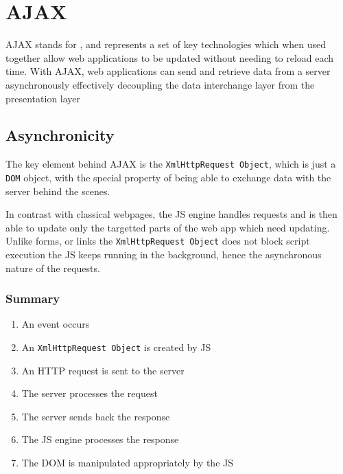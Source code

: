 \section{AJAX}

\par{AJAX stands for , and represents a set of key technologies which when used together allow web applications to be updated without needing to reload each time. With AJAX, web applications can send and retrieve data from a server asynchronously effectively decoupling the data interchange layer from the presentation layer}



	\subsection{Asynchronicity}


		\par{The key element behind AJAX is the \texttt{XmlHttpRequest Object}, which is just a \texttt{DOM} object, with the special property of being able to exchange data with the server behind the scenes.}

		\par{In contrast with classical webpages, the JS engine handles requests and is then able to update only the targetted parts of the web app which need updating. Unlike forms, or links the \texttt{XmlHttpRequest Object} does not block script execution the JS keeps running in the background, hence the asynchronous nature of the requests.}


		


	\subsubsection{Summary}

		\begin{enumerate}
			\item An event occurs
			\item An \texttt{XmlHttpRequest Object} is created by JS
			\item An HTTP request is sent to the server
			\item The server processes the request
			\item The server sends back the response
			\item The JS engine processes the response
			\item The DOM is manipulated appropriately by the JS
		\end{enumerate}


